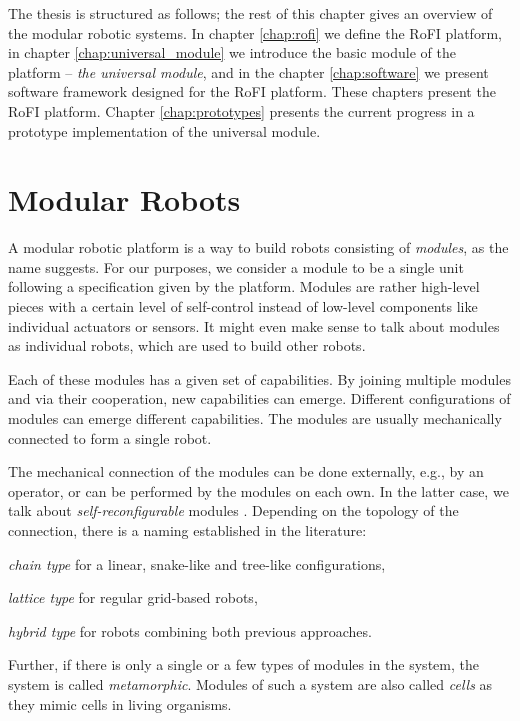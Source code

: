 The thesis is structured as follows; the rest of this chapter gives an overview
of the modular robotic systems. In chapter \ref{chap:rofi} we define the RoFI
platform, in chapter \ref{chap:universal_module} we introduce the basic module
of the platform -- \emph{the universal module}, and in the chapter
\ref{chap:software} we present software framework designed for the RoFI
platform. These chapters present the RoFI platform. Chapter
\ref{chap:prototypes} presents the current progress in a prototype
implementation of the universal module.

\section{Modular Robots}

A modular robotic platform is a way to build robots consisting of
\emph{modules}, as the name suggests. For our purposes, we consider a module to
be a single unit following a specification given by the platform. Modules are
rather high-level pieces with a certain level of self-control instead of
low-level components like individual actuators or sensors. It might even make
sense to talk about modules as individual robots, which are used to build other
robots\cite{brunete_current_2017}.

Each of these modules has a given set of capabilities. By joining multiple
modules and via their cooperation, new capabilities can emerge. Different
configurations of modules can emerge different capabilities. The modules are
usually mechanically connected to form a single robot.

The mechanical connection of the modules can be done externally, e.g., by an
operator, or can be performed by the modules on each own. In the latter case, we
talk about \emph{self-reconfigurable} modules \cite{brunete_current_2017}.
Depending on the topology of the connection, there is a naming established in
the literature\cite{brunete_current_2017}:
\begin{enumerate*}
    \item \emph{chain type} for a linear, snake-like and tree-like
    configurations,
    \item \emph{lattice type} for regular grid-based robots,
    \item \emph{hybrid type} for robots combining both previous approaches.
\end{enumerate*}
Further, if there is only a single or a few types of modules in the system, the
system is called \emph{metamorphic}\cite{brunete_current_2017}. Modules of such
a system are also called \emph{cells} as they mimic cells in living organisms.

